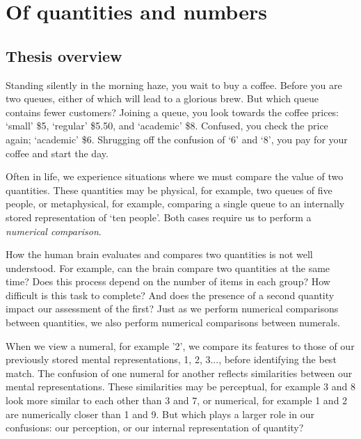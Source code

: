 \chapter{Of quantities and numbers}
\label{Chapter 1}

\vfill
\vfill

\newpage
\section{Thesis overview}
Standing silently in the morning haze, you wait to buy a coffee. Before you are two queues, either of which will lead to a glorious brew. But which queue contains fewer customers? Joining a queue, you look towards the coffee prices: `small' \$5, `regular' \$5.50, and `academic' \$8. Confused, you check the price again; `academic' \$6. Shrugging off the confusion of `6' and `8', you pay for your coffee and start the day. 

Often in life, we experience situations where we must compare the value of two quantities. These quantities may be physical, for example, two queues of five people, or metaphysical, for example, comparing a single queue to an internally stored representation of `ten people'. Both cases require us to perform a \textit{numerical comparison}. 

How the human brain evaluates and compares two quantities is not well understood. For example, can the brain compare two quantities at the same time? Does this process depend on the number of items in each group? How difficult is this task to complete? And does the presence of a second quantity impact our assessment of the first? Just as we perform numerical comparisons between quantities, we also perform numerical comparisons between numerals. 

When we view a numeral, for example '2', we compare its features to those of our previously stored mental representations, 1, 2, 3..., before identifying the best match. The confusion of one numeral for another reflects similarities between our mental representations. These similarities may be perceptual, for example 3 and 8 look more similar to each other than 3 and 7, or numerical, for example 1 and 2 are numerically closer than 1 and 9. But which plays a larger role in our confusions: our perception, or our internal representation of quantity?

